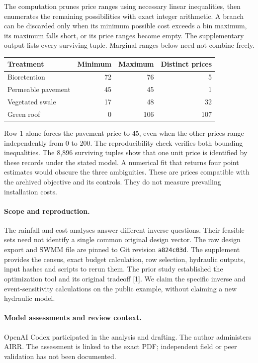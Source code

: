 \documentclass[11pt]{article}
\begin{document}
The computation prunes price ranges using necessary linear inequalities, then enumerates the remaining possibilities with exact integer arithmetic. A branch can be discarded only when its minimum possible cost exceeds a bin maximum, its maximum falls short, or its price ranges become empty. The supplementary output lists every surviving tuple. Marginal ranges below need not combine freely.
\begin{center}
\begin{tabular}{lrrr}\toprule
Treatment & Minimum & Maximum & Distinct prices\\\midrule
Bioretention & 72 & 76 & 5\\
Permeable pavement & 45 & 45 & 1\\
Vegetated swale & 17 & 48 & 32\\
Green roof & 0 & 106 & 107\\\bottomrule
\end{tabular}
\end{center}
Row 1 alone forces the pavement price to 45, even when the other prices range independently from 0 to 200. The reproducibility check verifies both bounding inequalities. The 8,896 surviving tuples show that one unit price is identified by these records under the stated model. A numerical fit that returns four point estimates would obscure the three ambiguities. These are prices compatible with the archived objective and its controls. They do not measure prevailing installation costs.

\paragraph{Scope and reproduction.} The rainfall and cost analyses answer different inverse questions. Their feasible sets need not identify a single common original design vector. The raw design export and SWMM file are pinned to Git revision \texttt{a824c03d}. The supplement provides the census, exact budget calculation, row selection, hydraulic outputs, input hashes and scripts to rerun them. The prior study established the optimization tool and its original tradeoff [1]. We claim the specific inverse and event-sensitivity calculations on the public example, without claiming a new hydraulic model.

\paragraph{Model assessments and review context.} OpenAI Codex participated in the analysis and drafting. The author administers AIRR. The assessment is linked to the exact PDF; independent field or peer validation has not been documented.
\end{document}
